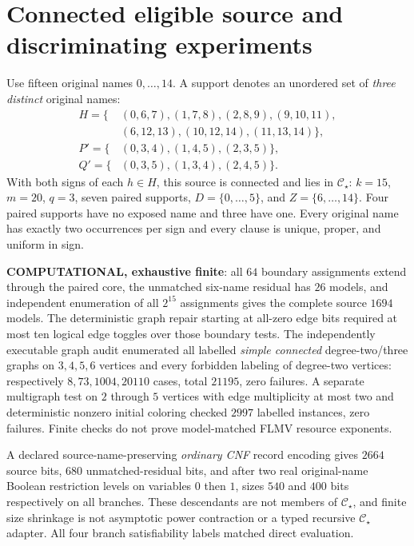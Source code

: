 \documentclass[11pt]{article}
\newcommand{\CS}{\mathcal C_\star}
\begin{document}
\section{Connected eligible source and discriminating experiments}
Use fifteen original names $0,\dots,14$. A support denotes an unordered set of \emph{three distinct} original names:
\[
\begin{split}
H=\{&(0,6,7),(1,7,8),(2,8,9),(9,10,11),\\
    &(6,12,13),(10,12,14),(11,13,14)\},\\
P'=\{&(0,3,4),(1,4,5),(2,3,5)\},\\
Q'=\{&(0,3,5),(1,3,4),(2,4,5)\}.
\end{split}
\]
With both signs of each $h\in H$, this source is connected and lies in $\CS$: $k=15$, $m=20$, $q=3$, seven paired supports, $D=\{0,\ldots,5\}$, and $Z=\{6,\ldots,14\}$. Four paired supports have no exposed name and three have one. Every original name has exactly two occurrences per sign and every clause is unique, proper, and uniform in sign.

\textbf{COMPUTATIONAL, exhaustive finite}: all $64$ boundary assignments extend through the paired core, the unmatched six-name residual has $26$ models, and independent enumeration of all $2^{15}$ assignments gives the complete source $1694$ models. The deterministic graph repair starting at all-zero edge bits required at most ten logical edge toggles over those boundary tests. The independently executable graph audit enumerated all labelled \emph{simple connected} degree-two/three graphs on $3,4,5,6$ vertices and every forbidden labeling of degree-two vertices: respectively $8,73,1004,20110$ cases, total $21195$, zero failures. A separate multigraph test on $2$ through $5$ vertices with edge multiplicity at most two and deterministic nonzero initial coloring checked $2997$ labelled instances, zero failures. Finite checks do not prove model-matched FLMV resource exponents.

A declared source-name-preserving \emph{ordinary CNF} record encoding gives $2664$ source bits, $680$ unmatched-residual bits, and after two real original-name Boolean restriction levels on variables $0$ then $1$, sizes $540$ and $400$ bits respectively on all branches. These descendants are not members of $\CS$, and finite size shrinkage is not asymptotic power contraction or a typed recursive $\CS$ adapter. All four branch satisfiability labels matched direct evaluation.
\end{document}
